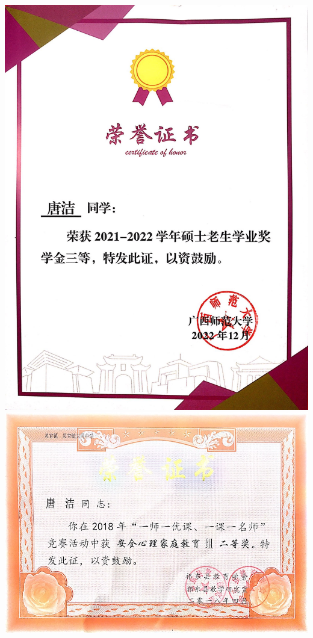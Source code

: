 \documentclass[UFT8]{ctexart}%
\begin{document}
\begin{center}
 \includegraphics[scale=0.15]{figs/2022-12.jpg }
 \includegraphics[scale=0.37]{figs/2018-04.jpg }

\end{center}
\end{document}
